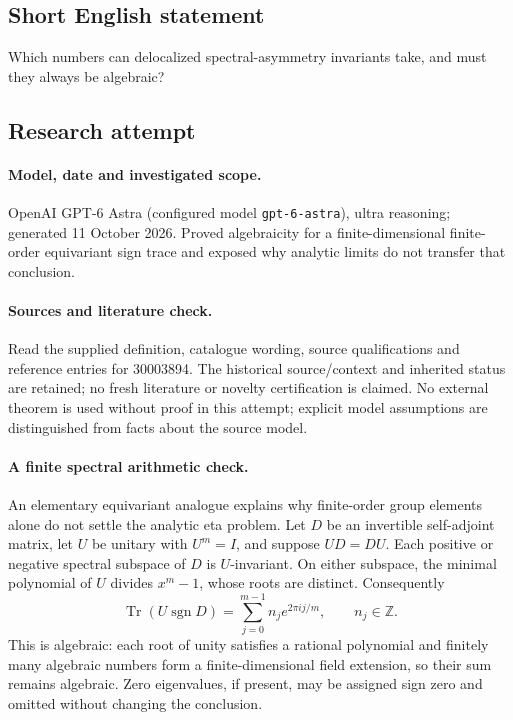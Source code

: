 \documentclass[11pt]{article}
\begin{document}
\subsection{Short English statement}
Which numbers can delocalized spectral-asymmetry invariants take, and must they always be algebraic?
\subsection{Research attempt}
\paragraph{Model, date and investigated scope.}
OpenAI GPT-6 Astra (configured model \texttt{gpt-6-astra}), ultra reasoning; generated 11 October 2026. Proved algebraicity for a finite-dimensional finite-order equivariant sign trace and exposed why analytic limits do not transfer that conclusion.

\paragraph{Sources and literature check.}
Read the supplied definition, catalogue wording, source qualifications and reference entries for 30003894. The historical source/context and inherited status are retained; no fresh literature or novelty certification is claimed. No external theorem is used without proof in this attempt; explicit model assumptions are distinguished from facts about the source model.

\paragraph{A finite spectral arithmetic check.} An elementary equivariant analogue explains why finite-order group elements alone do not settle the analytic eta problem. Let \(D\) be an invertible self-adjoint matrix, let \(U\) be unitary with \(U^m=I\), and suppose \(UD=DU\). Each positive or negative spectral subspace of \(D\) is \(U\)-invariant. On either subspace, the minimal polynomial of \(U\) divides \(x^m-1\), whose roots are distinct. Consequently
\[
 \operatorname{Tr}(U\operatorname{sgn}D)=\sum_{j=0}^{m-1}n_j e^{2\pi i j/m},\qquad n_j\in\mathbb Z.
\]
This is algebraic: each root of unity satisfies a rational polynomial and finitely many algebraic numbers form a finite-dimensional field extension, so their sum remains algebraic. Zero eigenvalues, if present, may be assigned sign zero and omitted without changing the conclusion.
\end{document}
